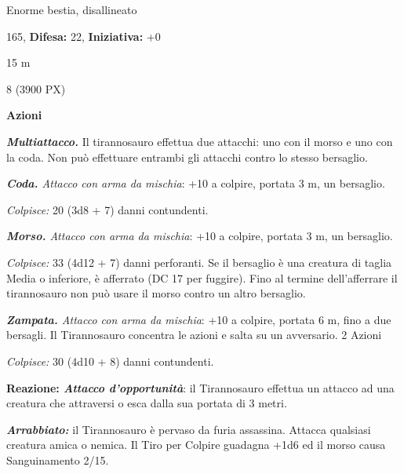 \begin{multicols}{2}
{
\noindent
\begin{description}[noitemsep, topsep=0pt, parsep=0pt, partopsep=0pt, leftmargin=0cm, labelwidth=2.2cm]
	\item[\textbf{Taglia/Tipo:}] Enorme bestia, disallineato
	\item[\textbf{Caratt.:}] 
	\item[\textbf{Punti Ferita:}] 165,  \textbf{Difesa:} 22,  \textbf{Iniziativa:} +0
	\item[\textbf{Movimento:}] 15 m
	\item[\textbf{Tiri Salvez.:}] 
	\item[\textbf{Sfida:}] 8 (3900 PX)\smallskip
\end{description}

\textbf{Azioni}

\emph{\textbf{Multiattacco.}} Il tirannosauro effettua due attacchi: uno con il morso e uno con la coda. Non può effettuare entrambi gli attacchi contro lo stesso bersaglio.

\emph{\textbf{Coda.} Attacco con arma da mischia}: +10 a colpire, portata 3 m, un bersaglio.

\emph{Colpisce:} 20 (3d8 + 7) danni contundenti.

\emph{\textbf{Morso.} Attacco con arma da mischia}: +10 a colpire, portata 3 m, un bersaglio.

\emph{Colpisce:} 33 (4d12 + 7) danni perforanti. Se il bersaglio è una creatura di taglia Media o inferiore, è afferrato (DC 17 per fuggire). Fino al termine dell'afferrare il tirannosauro non può usare il morso contro un altro bersaglio.

\emph{\textbf{Zampata.} Attacco con arma da mischia}: +10 a colpire, portata 6 m, fino a due bersagli. Il Tirannosauro concentra le azioni e salta su un avversario. 2 Azioni

\emph{Colpisce:} 30 (4d10 + 8) danni contundenti.

\textbf{Reazione: \emph{Attacco d'opportunità}}: il Tirannosauro effettua un attacco ad una creatura che attraversi o esca dalla sua portata di 3 metri.

\emph{\textbf{Arrabbiato:}} il Tirannosauro è pervaso da furia assassina. Attacca qualsiasi creatura amica o nemica. Il Tiro per Colpire guadagna +1d6 ed il morso causa Sanguinamento 2/15.

}
\end{multicols}
